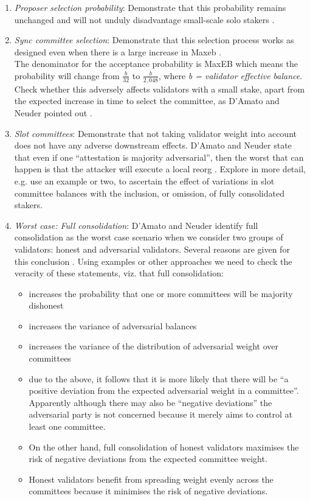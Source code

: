 \documentclass[UTF8]{article}
\begin{document}
\begin{enumerate}

\item \textit{Proposer selection probability}: Demonstrate that this  probability remains unchanged and will not unduly disadvantage small-scale solo stakers \cite{Neuder2023a}. 

\item \textit{Sync committee selection}: Demonstrate that this selection process works as designed even when there is a large increase in Max\gls{eb} \cite{Neuder2023a}.\\
The denominator for the acceptance probability is MaxEB which means the probability will change from $\frac{b}{32}$ to $\frac{b}{2,048}$, where \textit{b = validator effective balance}. Check whether this adversely affects validators with a small stake, apart from the expected increase in time to select the committee, as D'Amato and Neuder pointed out \cite{damato2023}.

\item \textit{Slot committees}: Demonstrate that not taking validator weight into account does not have any adverse downstream effects. D'Amato and Neuder state that even if one ``attestation is majority adversarial'', then the worst that can happen is that the attacker will execute a local reorg \cite{damato2023}. Explore in more detail, e.g. use an example or two, to ascertain the effect of variations in slot committee balances with the inclusion, or omission, of fully consolidated stakers. 

\item \textit{Worst case: Full consolidation}: D'Amato and Neuder identify full consolidation as the worst case scenario when we consider two groups of validators: honest and adversarial validators. Several reasons are given for this conclusion \cite{damato2023}. Using examples or other approaches we need to check the veracity of these statements, viz. that full consolidation:
	\begin{itemize}
	\item increases the probability that one or more committees will be majority dishonest
	\item increases the variance of adversarial balances
	\item increases the variance of the distribution of adversarial weight over committees
	\item due to the above, it follows that it is more likely that there will be ``a positive deviation from the expected adversarial weight in a committee''. Apparently although there may also be ``negative deviations'' the adversarial party is not concerned because it merely aims to control at least one committee.
	\item On the other hand, full consolidation of honest validators maximises the risk of negative deviations from the expected committee weight.
	\item Honest validators benefit from spreading weight evenly across the committees because it minimises the risk of negative deviations.
	\end{itemize}


\end{enumerate}
\end{document}
